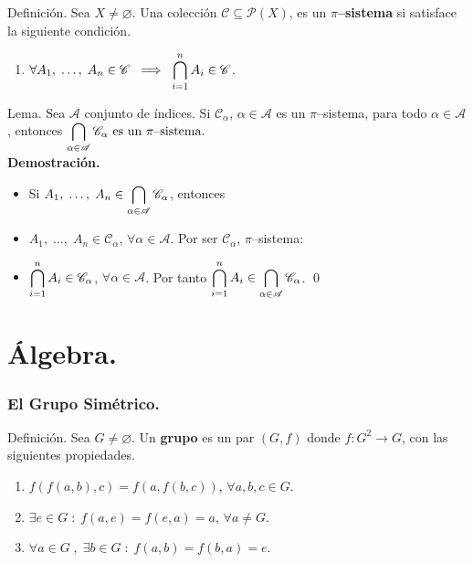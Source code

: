 \documentclass{beamer}
\begin{document}
\begin{frame}[t]
	\begin{block}{Definición.}
		Sea \(X \ne \varnothing\). Una colección \(\mathscr{C} \subseteq \mathscr{P}(X)\), es un \textbf{\(\pi\)--sistema} si satisface la siguiente condición.
		\begin{enumerate}
			\item \(\forall A_1, \;\ldots,\; A_n \in \mathscr{C} \;\implies\; \displaystyle\bigcap_{i=1}^{n} A_i \in \mathscr{C}\).
		\end{enumerate}
	\end{block}
	\vspace{3mm}
	\begin{block}{Lema.}
		Sea \(\mathscr{A}\) conjunto de índices. Si \(\mathscr{C} _\alpha\), \(\alpha \in \mathscr{A}\) es un \(\pi \)--sistema, para todo \(\alpha \in \mathscr{A}\), entonces \(\displaystyle\bigcap_{\alpha \in \mathscr{A}} \mathscr{C}_\alpha \mbox{ es un } \pi \mbox{--sistema.}\) \\[2mm]
		\textbf{Demostración.}
		\begin{itemize}
			\item Si \(A_1, \;\ldots,\; A_n \in \displaystyle\bigcap_{\alpha \in \mathscr{A}} \mathscr{C} _\alpha\), entonces
			\item \(A_1, \;\ldots,\; A_n \in \mathscr{C} _\alpha\), \(\forall \alpha \in \mathscr{A}\). Por ser \(\mathscr{C} _\alpha\), \(\pi\)--sistema:
			\item \(\displaystyle\bigcap_{i=1}^{n} A_i \in \mathscr{C} _\alpha\), \(\forall \alpha \in \mathscr{A}\). Por tanto \(\displaystyle\bigcap_{i=1}^{n} A_i \in \displaystyle\bigcap_{\alpha \in \mathscr{A}} \mathscr{C} _\alpha\). \qed
		\end{itemize}
	\end{block}
\end{frame}

\section{Álgebra.} %
\frame{\sectionpage}
\begin{frame}[t]
	\frametitle{El Grupo Simétrico.}
	\begin{block}{Definición.}
		Sea \(G \ne \varnothing\). Un \textbf{grupo} es un par \((G,f)\) donde \(f:G^2 \longrightarrow G\), con las siguientes propiedades.
		\begin{enumerate}
			\item \(f(f(a,b) ,c) = f(a,f(b,c))\), \(\forall a,b,c \in G\).
			\item \(\exists e \in G \;:\; f(a,e) = f(e,a) = a\), \(\forall a \ne G\).
			\item \(\forall a \in G \;,\; \exists b \in G \;:\; f(a,b) = f(b,a) = e\).
		\end{enumerate}
	\end{block}
\end{frame}


\end{document}
